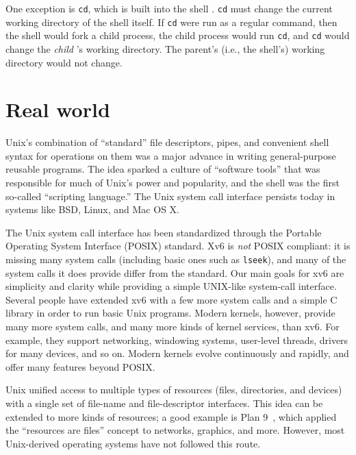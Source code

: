 One exception is
\lstinline{cd},
which is built into the shell
.
\lstinline{cd}
must change the current working directory of the
shell itself.  If
\lstinline{cd}
were run as a regular command, then the shell would fork a child
process, the child process would run
\lstinline{cd},
and
\lstinline{cd}
would change the 
\textit{child} 's 
working directory.  The parent's (i.e.,
the shell's) working directory would not change.
\section{Real world}

Unix's combination of ``standard'' file
descriptors, pipes, and convenient shell syntax for
operations on them was a major advance in writing
general-purpose reusable programs.
The idea sparked a culture of ``software tools'' that was
responsible for much of Unix's power and popularity,
and the shell was the first so-called ``scripting language.''
The Unix system call interface persists today in systems like
BSD, Linux, and Mac OS X.

The Unix system call interface has been standardized through the Portable
Operating System Interface (POSIX) standard.
Xv6 is
\textit{not}
POSIX compliant:  it is missing many system calls (including basic ones such as
\lstinline{lseek}),
and many of the system calls it does provide differ from the standard.
Our main goals for xv6 are
simplicity and clarity while providing a simple UNIX-like system-call interface.
Several people have extended xv6 with a few more system calls and a simple
C library in order to run basic Unix programs.  Modern kernels, however,
provide many more system calls, and many more kinds of kernel services, than
xv6.  For example, they support networking, windowing systems, user-level threads,
drivers for many devices, and so on.  Modern kernels evolve continuously and
rapidly, and offer many features beyond POSIX.

Unix unified access to multiple types of resources (files,
directories, and devices) with a single set of 
file-name and file-descriptor interfaces.
This idea can be extended to more kinds of resources;
a good example is Plan 9~\cite{Presotto91plan9},
which applied the ``resources are files''
concept to 
networks, graphics, and more.
However, most Unix-derived operating systems have
not followed this route.

